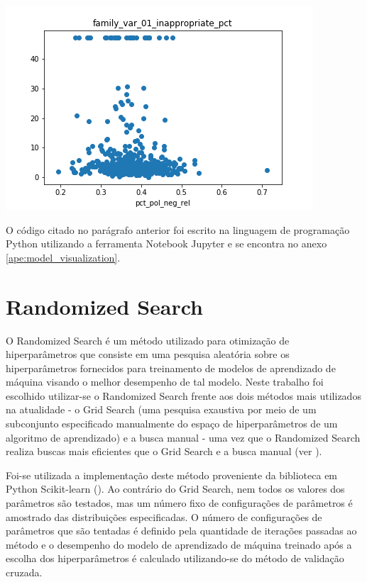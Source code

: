 \graphicspath{ {./figuras/two_by_two_scatter_plot/} }
\includegraphics{04_family_var_01_inappropriate_pct}

O código citado no parágrafo anterior foi escrito na linguagem de programação Python utilizando a ferramenta Notebook Jupyter e se encontra no anexo \ref{ape:model_visualization}.

\section{Randomized Search}
\label{sec:randomized_search}

O Randomized Search é um método utilizado para otimização de hiperparâmetros que consiste em uma pesquisa aleatória sobre os hiperparâmetros fornecidos para treinamento de modelos de aprendizado de máquina visando o melhor desempenho de tal modelo. Neste trabalho foi escolhido utilizar-se o Randomized Search frente aos dois métodos mais utilizados na atualidade - o Grid Search (uma pesquisa exaustiva por meio de um subconjunto especificado manualmente do espaço de hiperparâmetros de um algoritmo de aprendizado) e a busca manual - uma vez que o Randomized Search realiza buscas mais eficientes que o Grid Search e a busca manual (ver \citet{Bergstra2012}).

Foi-se utilizada a implementação deste método proveniente da biblioteca em Python Scikit-learn (\citet{Sklearn}). Ao contrário do Grid Search, nem todos os valores dos parâmetros são testados, mas um número fixo de configurações de parâmetros é amostrado das distribuições especificadas. O número de configurações de parâmetros que são tentadas é definido pela quantidade de iterações passadas ao método e o desempenho do modelo de aprendizado de máquina treinado após a escolha dos hiperparâmetros é calculado utilizando-se do método de validação cruzada.

